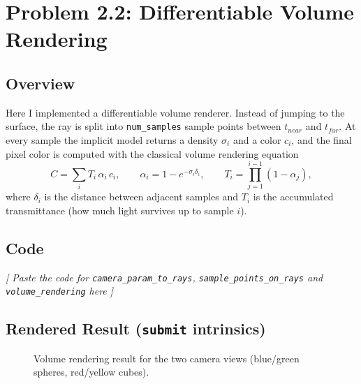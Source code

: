 \documentclass[11pt]{article}
\begin{document}
\section{Problem 2.2: Differentiable Volume Rendering}

\subsection{Overview}
Here I implemented a differentiable volume renderer. Instead of jumping to the surface, the
ray is split into \texttt{num\_samples} sample points between $t_{near}$ and $t_{far}$. At
every sample the implicit model returns a density $\sigma_i$ and a color $c_i$, and the final
pixel color is computed with the classical volume rendering equation
\begin{equation}
    C = \sum_i T_i\,\alpha_i\,c_i, \qquad
    \alpha_i = 1 - e^{-\sigma_i \delta_i}, \qquad
    T_i = \prod_{j=1}^{i-1}\left(1-\alpha_j\right),
\end{equation}
where $\delta_i$ is the distance between adjacent samples and $T_i$ is the accumulated
transmittance (how much light survives up to sample $i$).

\subsection{Code}
\vspace{1cm}
\textit{[ Paste the code for \texttt{camera\_param\_to\_rays}, \texttt{sample\_points\_on\_rays} and \texttt{volume\_rendering} here ]}
\vspace{1cm}

\subsection{Rendered Result (\texttt{submit} intrinsics)}
\begin{figure}[h]
    \centering
    \caption{Volume rendering result for the two camera views
    (blue/green spheres, red/yellow cubes).}
    \label{fig:volume_rendering}
\end{figure}

\end{document}
